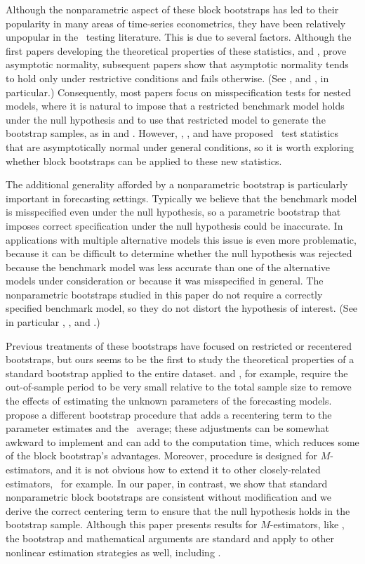 \documentclass[12pt,fleqn]{article}
\begin{document}
Although the nonparametric aspect of these block bootstraps has led to
their popularity in many areas of time-series econometrics, they have
been relatively unpopular in the \oos\ testing literature. This is due
to several factors. Although the first papers developing the
theoretical properties of these statistics, \cite{DiM:95} and
\cite{Wes:96}, prove asymptotic normality, subsequent papers show that
asymptotic normality tends to hold only under restrictive conditions
and fails otherwise. (See \citealp{ClM:01}, and \citealp{Mcc:07}, in
particular.) Consequently, most papers focus on misspecification tests
for nested models, where it is natural to impose that a restricted
benchmark model holds under the null hypothesis and to use that
restricted model to generate the bootstrap samples, as in
\cite{Lut:99} and \cite{ClM:05}.
However, \cite{GiW:06}, \cite{ClW:06,ClW:07}, and \cite{Cal:16} have
proposed \oos\ test statistics that are asymptotically normal under
general conditions, so it is worth exploring whether block bootstraps
can be applied to these new statistics.

The additional generality afforded by a nonparametric bootstrap is
particularly important in forecasting settings. Typically we believe
that the benchmark model is misspecified even under the null
hypothesis, so a parametric bootstrap that imposes correct
specification under the null hypothesis could be inaccurate.  In
applications with multiple alternative models this issue is even more
problematic, because it can be difficult to determine whether the null
hypothesis was rejected because the benchmark model was less accurate
than one of the alternative models under consideration or because it
was misspecified in general. The nonparametric bootstraps studied in
this paper do not require a correctly specified benchmark model, so
they do not distort the hypothesis of interest.
(See in
particular \citealp{Whi:00}, \citealp{Han:05}, and \citealp{RoW:05}.)

Previous treatments of these bootstraps have focused on restricted or
recentered bootstraps, but ours seems to be the first to study the
theoretical properties of a standard bootstrap applied to the entire
dataset. \citet{Whi:00} and \citet{Han:05}, for example, require the
out-of-sample period to be very small relative to the total sample
size to remove the effects of estimating the unknown parameters of the
forecasting models. \cite{CoS:07} propose a different bootstrap
procedure that adds a recentering term to the parameter estimates and
the \oos\ average; these adjustments can be somewhat awkward to
implement and can add to the computation time, which reduces some of
the block bootstrap's advantages. Moreover,  procedure
is designed for $M$-estimators, and it is not obvious how to extend it
to other closely-related estimators, \gmm\ for example. In our paper,
in contrast, we show that standard nonparametric block bootstraps are
consistent without modification and we derive the correct centering
term to ensure that the null hypothesis holds in the bootstrap
sample. Although this paper presents results for $M$-estimators, like
, the bootstrap and mathematical arguments are
standard and apply to other nonlinear estimation strategies as well,
including \gmm.
\end{document}
